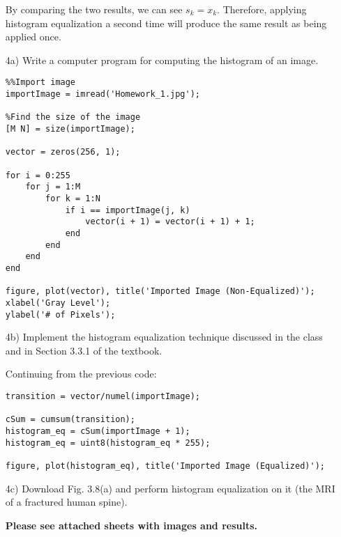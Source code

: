\documentclass{article}
\begin{document}
\begin{enumerate}
By comparing the two results, we can see $s_k=x_k$.  Therefore, applying histogram equalization a second time will produce the same result
as being applied once.

\item[4a)] Write a computer program for computing the histogram of an
image.

\begin{lstlisting}
%%Import image
importImage = imread('Homework_1.jpg');

%Find the size of the image
[M N] = size(importImage);

vector = zeros(256, 1);

for i = 0:255
    for j = 1:M
        for k = 1:N
            if i == importImage(j, k)
                vector(i + 1) = vector(i + 1) + 1;
            end
        end
    end
end

figure, plot(vector), title('Imported Image (Non-Equalized)');
xlabel('Gray Level');
ylabel('# of Pixels');
\end{lstlisting}

\item[4b)] Implement the histogram equalization technique discussed in the
class and in Section 3.3.1 of the textbook.

Continuing from the previous code:
\begin{lstlisting}
transition = vector/numel(importImage);

cSum = cumsum(transition);
histogram_eq = cSum(importImage + 1);
histogram_eq = uint8(histogram_eq * 255);

figure, plot(histogram_eq), title('Imported Image (Equalized)');
\end{lstlisting}

\item[4c)] Download Fig. 3.8(a) and perform histogram equalization on it
(the MRI of a fractured human spine).

\textbf {Please see attached sheets with images and results.}
\end{enumerate}
\end{document}

